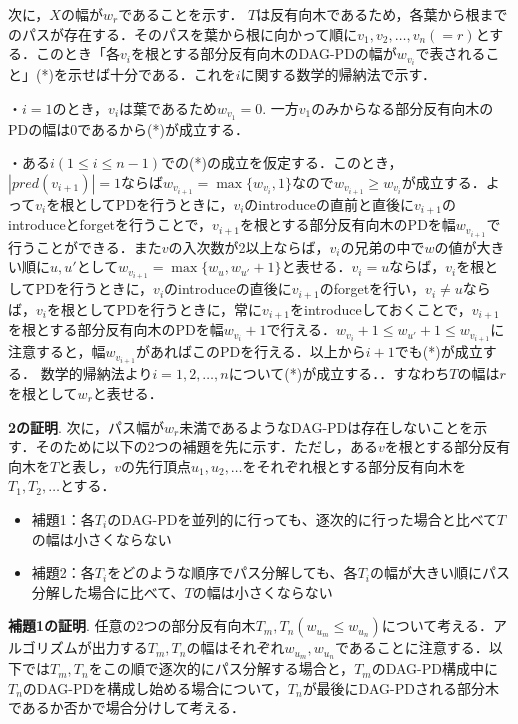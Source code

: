 \documentclass{kuisthesis}           %
\begin{document}
 次に，$X$の幅が$w_r$であることを示す． $T$は反有向木であるため，各葉から根までのパスが存在する．そのパスを葉から根に向かって順に$v_1, v_2,   \ldots, v_n(=r)$とする．このとき「各$v_i$を根とする部分反有向木のDAG-PDの幅が$w_{v_i}$で表されること」(*)を示せば十分である．これを$i$に関する数学的帰納法で示す．
 
・$i=1$のとき，$v_i$は葉であるため$w_{v_1}=0$. 一方$v_1$のみからなる部分反有向木のPDの幅は0であるから(*)が成立する．

・ある$i(1 \leq i \leq n-1)$での(*)の成立を仮定する．このとき，$|pred(v_{i+1})|=1$ならば$w_{v_{i+1}}= \max\{w_{v_i}, 1\}$なので$w_{v_{i+1}} \geq w_{v_i}$が成立する．よって$v_i$を根としてPDを行うときに，$v_i$のintroduceの直前と直後に$v_{i+1}$のintroduceとforgetを行うことで，$v_{i+1}$を根とする部分反有向木のPDを幅$w_{v_{i+1}}$で行うことができる．また$v$の入次数が2以上ならば，$v_i$の兄弟の中で$w$の値が大きい順に$u, u'$として$w_{v_{i+1}}= \max\{w_u, w_{u'}+1\}$と表せる．$v_i=u$ならば，$v_i$を根としてPDを行うときに，$v_i$のintroduceの直後に$v_{i+1}$のforgetを行い，$v_i \neq u$ならば，$v_i$を根としてPDを行うときに，常に$v_{i+1}$をintroduceしておくことで，$v_{i+1}$を根とする部分反有向木のPDを幅$w_{v_i}+1$で行える．$w_{v_i}+1 \leq w_{u'}+1 \leq w_{v_{i+1}}$に注意すると，幅$w_{v_{i+1}}$があればこのPDを行える．以上から$i+1$でも(*)が成立する．
数学的帰納法より$i=1, 2,   \ldots, n$について(*)が成立する．．すなわち$T$の幅は$r$を根として$w_r$と表せる．

 \textbf{2の証明}. 
 次に，パス幅が$w_r$未満であるようなDAG-PDは存在しないことを示す．そのために以下の2つの補題を先に示す．ただし，ある$v$を根とする部分反有向木を$T$と表し，$v$の先行頂点$u_1, u_2,  \ldots $をそれぞれ根とする部分反有向木を$T_1, T_2,  \ldots $とする．


 \begin{itemize}
  \item 補題1：各$T_i$のDAG-PDを並列的に行っても、逐次的に行った場合と比べて$T$の幅は小さくならない
  \item 補題2：各$T_i$をどのような順序でパス分解しても、各$T_i$の幅が大きい順にパス分解した場合に比べて、$T$の幅は小さくならない
 \end{itemize}

 \textbf{補題1の証明}.
 任意の2つの部分反有向木$T_m, T_n(w_{u_m}\leq w_{u_n})$について考える．アルゴリズムが出力する$T_m, T_n$の幅はそれぞれ$w_{u_m}, w_{u_n}$であることに注意する．以下では$T_m, T_n$をこの順で逐次的にパス分解する場合と，$T_m$のDAG-PD構成中に$T_n$のDAG-PDを構成し始める場合について，$T_n$が最後にDAG-PDされる部分木であるか否かで場合分けして考える．
\end{document}
